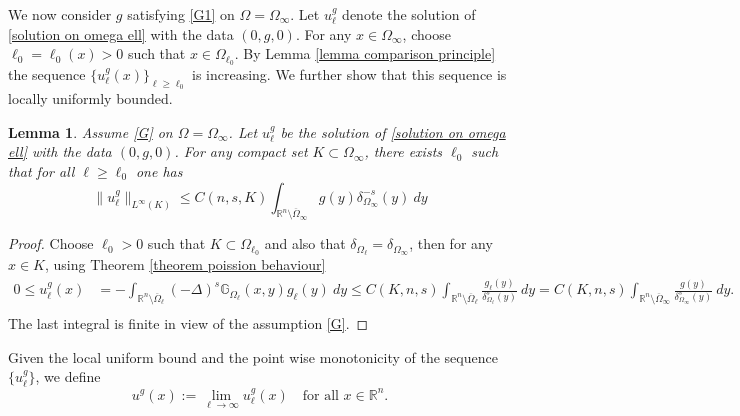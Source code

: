 \documentclass{amsart}
\newtheorem{lemma}[theorem]{Lemma}
\newcommand{\R}{\mathbb{R}}
\newcommand{\slap}{(-\Delta)^{s}}
\newcommand{\rn}{\mathbb{R}^{n}}
\newcommand{\gk}[1]{\mathbb{G}_{#1}}
\newcommand{\ul}{u_{\ell}}
\begin{document}
We now consider $g$ satisfying \ref{G1} on $\Omega=\Omega_{\infty}$. Let $\ul^{g}$ denote the solution of \eqref{solution on omega ell} with the data $(0,g,0)$. For any $x\in \Omega_{\infty}$, choose $\ell_{0}=\ell_{0}(x)>0$ such that $x\in \Omega_{\ell_{0}}$. By Lemma \ref{lemma comparison principle} the sequence $\{u^{g}_{\ell}(x)\}_{\ell\geq \ell_{0}}$ is increasing.  We further show that this sequence is locally uniformly bounded.
\begin{lemma}
    Assume \ref{G} on $\Omega=\Omega_{\infty}$. Let $\ul^{g}$ be the solution of \eqref{solution on omega ell} with the data $(0,g,0)$. For any compact set $K\subset \Omega_{\infty}$, there exists $\ell_{0}$ such that for all $\ell\geq \ell_{0}$ one has 
    \begin{equation}\label{eqn l infty bound for solution with g ell}
        \|\ul^{g}\|_{L^{\infty}(K)}\leq C(n,s,K)\int_{\R^{n}\setminus\overline{\Omega}_{\infty}}g(y) \delta_{\Omega_{\infty}}^{-s}(y)\ dy
    \end{equation}
\end{lemma} 
\begin{proof}
    Choose $\ell_{0}>0$ such that $K\subset \Omega_{\ell_{0}}$ and also that $\delta_{\Omega_{\ell}}=\delta_{\Omega_{\infty}}$, then for any $x\in K$, using Theorem \ref{theorem poission behaviour}
\begin{equation*}
\begin{split}
    0\leq \ul^{g}(x)&= -\int_{\R^{n}\setminus\overline{\Omega}_{\ell}}\slap \gk{\Omega_{\ell}}(x,y) g_{\ell}(y)\ dy \leq C(K,n,s)\int_{\R^{n}\setminus\overline{\Omega}_{\ell}} \frac{g_{\ell}(y)}{\delta_{\Omega_{\ell}}^{s}(y)} \ dy= C(K,n,s)\int_{\R^{n}\setminus\overline{\Omega}_{\infty}}\frac{g(y)}{\delta_{\Omega_{\infty}}^{s}(y)}\ dy.\\
\end{split}
\end{equation*}
The last integral is finite in view of the assumption \ref{G}.
\end{proof}
Given the local uniform bound and the point wise  monotonicity of the sequence $\{\ul^{g}\}$, we define
\begin{equation}\label{dfn of ug with g}
    u^{g}(x):=\lim_{\ell\to\infty} \ul^{g}(x) \quad \text{for all } x\in \rn.
\end{equation}
\end{document}
